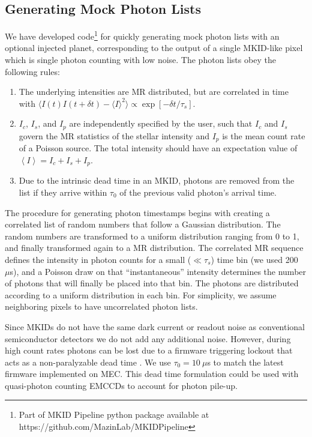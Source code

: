 \documentclass[../main.tex]{subfiles}
\begin{document}
\subsection{Generating Mock Photon Lists}

We have developed code\footnote{Part of MKID Pipeline python package available at https://github.com/MazinLab/MKIDPipeline} for quickly generating mock photon lists with an optional injected planet, corresponding to the output of a single MKID-like pixel which is single photon counting with low noise. The photon lists obey the following rules: 

\begin{enumerate}
    \item The underlying intensities are MR distributed, but are correlated in time with $\langle I(t)I(t + \delta t )  - \langle I \rangle^2 \rangle \propto \exp{\left[-\delta t / \tau_s\right]}$. 
    \item $I_c$, $I_s$, and $I_p$ are independently specified by the user, such that $I_c$ and $I_s$ govern the MR statistics of the stellar intensity and $I_p$ is the mean count rate of a Poisson source. The total intensity should have an expectation value of $\left\langle I \right\rangle = I_c + I_s + I_p$. 
    \item Due to the intrinsic dead time in an MKID, photons are removed from the list if they arrive within $\tau_0$ of the previous valid photon's arrival time. 
\end{enumerate}

The procedure for generating photon timestamps begins with creating a correlated list of random numbers that follow a Gaussian distribution. The random numbers are transformed to a uniform distribution ranging from 0 to 1, and finally transformed again to a MR distribution. The correlated MR sequence defines the intensity in photon counts for a small ($\ll \tau_s$) time bin (we used 200~$\mu$s), and a Poisson draw on that ``instantaneous'' intensity determines the number of photons that will finally be placed into that bin. The photons are distributed according to a uniform distribution in each bin. For simplicity, we assume neighboring pixels to have uncorrelated photon lists. 

Since MKIDs do not have the same dark current or readout noise as conventional semiconductor detectors we do not add any additional noise. However, during high count rates photons can be lost due to a firmware triggering lockout that acts as a non-paralyzable dead time \parencite{Eyken_2015}. We use $\tau_0 = 10~\mu$s to match the latest firmware implemented on MEC. This dead time formulation could be used with quasi-photon counting EMCCDs to account for photon pile-up. 
\end{document}

